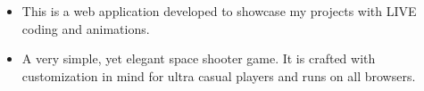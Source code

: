 \documentclass[10pt,a4paper,ragged2e]{altacv}
\begin{document}
\begin{itemize}
\item This is a web application developed to showcase my projects with LIVE coding and animations.
\end{itemize}


\begin{itemize}
\item A very simple, yet elegant space shooter game. It is crafted with customization in mind for ultra casual players and runs on all browsers.  
\end{itemize}















\end{document}
